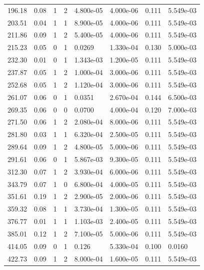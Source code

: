 \documentclass[preview]{standalone}
\begin{document}
{{\begin{tabular}{L{1.2cm}C{1.2cm} C{0.3cm}C{0.5cm} C{1.4cm}C{1.4cm} C{1.4cm}C{1.4cm}}
  196.18  &  0.08  & 1     &  2 &  4.800e-05  & 4.000e-06  & 0.111 &  5.549e-03   \\ 
  203.51  &  0.04  & 1     &  1 &  8.900e-05  & 4.000e-06  & 0.111 &  5.549e-03   \\ 
  211.86  &  0.09  & 1     &  2 &  5.400e-05  & 4.000e-06  & 0.111 &  5.549e-03   \\ 
  215.23  &  0.05  & 0     &  1 &  0.0269  & 1.330e-04  & 0.130 &  5.000e-03   \\ 
  232.30  &  0.01  & 0     &  1 &  1.343e-03  & 1.200e-05  & 0.111 &  5.549e-03   \\ 
  237.87  &  0.05  & 1     &  2 &  1.000e-04  & 3.000e-06  & 0.111 &  5.549e-03   \\ 
  252.68  &  0.05  & 1     &  2 &  1.120e-04  & 3.000e-06  & 0.111 &  5.549e-03   \\ 
  261.07  &  0.06  & 0     &  1 &  0.0351  & 2.670e-04  & 0.144 &  6.500e-03   \\ 
  269.35  &  0.06  & 0     &  0 &  0.0700  & 4.000e-04  & 0.120 &  7.000e-03   \\ 
  271.50  &  0.06  & 1     &  2 &  2.080e-04  & 8.000e-06  & 0.111 &  5.549e-03   \\ 
  281.80  &  0.03  & 1     &  1 &  6.320e-04  & 2.500e-05  & 0.111 &  5.549e-03   \\ 
  289.64  &  0.09  & 1     &  2 &  4.800e-05  & 5.000e-06  & 0.111 &  5.549e-03   \\ 
  291.61  &  0.06  & 0     &  1 &  5.867e-03  & 9.300e-05  & 0.111 &  5.549e-03   \\ 
  312.30  &  0.07  & 1     &  2 &  3.930e-04  & 6.000e-06  & 0.111 &  5.549e-03   \\ 
  343.79  &  0.07  & 1     &  0 &  6.800e-04  & 4.000e-05  & 0.111 &  5.549e-03   \\ 
  351.61  &  0.19  & 1     &  2 &  2.900e-05  & 2.000e-06  & 0.111 &  5.549e-03   \\ 
  359.32  &  0.08  & 1     &  1 &  3.730e-04  & 1.300e-05  & 0.111 &  5.549e-03   \\ 
  376.77  &  0.01  & 1     &  1 &  1.103e-03  & 2.400e-05  & 0.111 &  5.549e-03   \\ 
  385.01  &  0.12  & 1     &  2 &  7.100e-05  & 5.000e-06  & 0.111 &  5.549e-03   \\ 
  414.05  &  0.09  & 0     &  1 &  0.126  & 5.330e-04  & 0.100 &  0.0160   \\ 
  422.73  &  0.09  & 1     &  2 &  8.000e-04  & 1.600e-05  & 0.111 &  5.549e-03   \\ 

\end{tabular}}}
\end{document}
